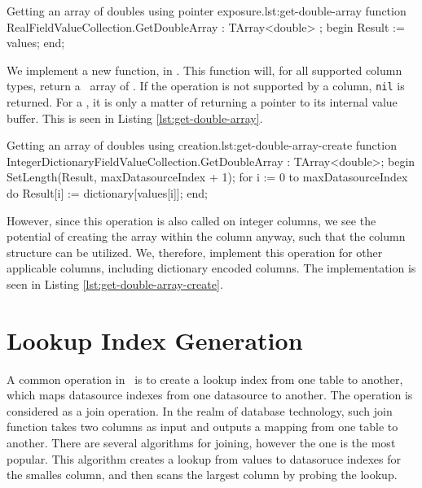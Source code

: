 \begin{delphicode}{Getting an array of doubles using pointer exposure.}{lst:get-double-array}
function RealFieldValueCollection.GetDoubleArray
: TArray<double> ;
begin
  Result := values;
end;
\end{delphicode}
We implement a new function,  in . This function will, for all supported column types, return a \delphi~array of . If the operation is not supported by a column, \texttt{nil} is returned. For a , it is only a matter of returning a pointer to its internal value buffer.  This is seen in Listing \ref{lst:get-double-array}.
\begin{delphicode}{Getting an array of doubles using creation.}{lst:get-double-array-create}
function IntegerDictionaryFieldValueCollection.GetDoubleArray
: TArray<double>;
begin
  SetLength(Result, maxDatasourceIndex + 1);
  for i := 0 to maxDatasourceIndex do
    Result[i] := dictionary[values[i]];
end;
\end{delphicode}
However, since this operation is also called on integer columns, we see the potential of creating the array within the column anyway, such that the column structure can be utilized. We, therefore, implement this operation for other applicable columns, including dictionary encoded columns. The implementation is seen in Listing \ref{lst:get-double-array-create}.

\section{Lookup Index Generation}
\label{sec:Lookup Index Generation}
A common operation in \bd~is to create a lookup index from one table to another, which maps datasource indexes from one datasource to another. The operation is considered as a join operation. In the realm of database technology, such join function takes two columns as input and outputs a mapping from one table to another. There are several algorithms for joining, however the  one is the most popular. This algorithm creates a lookup from values to datasoruce indexes for the smalles column, and then scans the largest column by probing the lookup.  

